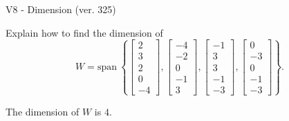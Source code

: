 \begin{exercise}
  \begin{exerciseTitle}V8 - Dimension (ver. 325)\end{exerciseTitle}
  \begin{exerciseStatement}
    Explain how to find the dimension of 
\[W=\mathrm{span}\ \left\{\left[\begin{array}{r}
2 \\
3 \\
2 \\
0 \\
-4
\end{array}\right] , \left[\begin{array}{r}
-4 \\
-2 \\
0 \\
-1 \\
3
\end{array}\right] , \left[\begin{array}{r}
-1 \\
3 \\
3 \\
-1 \\
-3
\end{array}\right] , \left[\begin{array}{r}
0 \\
-3 \\
0 \\
-1 \\
-3
\end{array}\right]\right\}.\]



  \end{exerciseStatement}
  \begin{exerciseAnswer}
   The dimension of \(W\) is  \(4\).
  


  \end{exerciseAnswer}
\end{exercise}